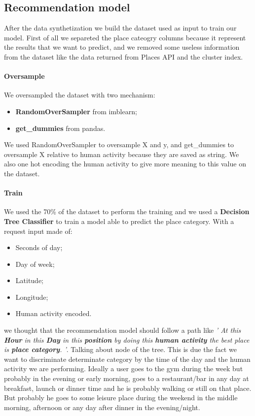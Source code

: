 \documentclass[../../main]{subfiles}
\begin{document}
\label{ss:recommendation-model}
\subsection{Recommendation model}
After the data synthetization we build the dataset used as input to train our model. First of all we separeted the place cateogry columns because it represent the results that we want to predict, and we removed some useless information from the dataset like the data returned from Places API and the cluster index.
\paragraph*{Oversample}
We oversampled the dataset with two mechanism:
\begin{itemize}
    \item \textbf{RandomOverSampler} from imblearn;
    \item \textbf{get\_dummies} from pandas.
\end{itemize}

We used RandomOverSampler to oversample X and y, and get\_dummies to oversample X relative to human activity
because they are saved as string. We also one hot encoding the human activity to give more meaning to this value on the dataset.

\paragraph*{Train}
We used the 70\% of the dataset to perform the training and we used a \textbf{Decision Tree Classifier} to train a model able to
predict the place category. 
With a request input made of:
\begin{itemize}
    \item Seconds of day;
    \item Day of week;
    \item Latitude;
    \item Longitude;
    \item Human activity encoded.
\end{itemize}
we thought that the recommendation model should follow a path like \textit{' At this \textbf{Hour} in this \textbf{Day} in this \textbf{position} by doing this \textbf{human activity} the best place is \textbf{place category}. '}.
Talking about node of the tree. This is due the fact we want to discriminate determinate category by the time of the day and the human activity we are performing.
Ideally a user goes to the gym during the week but probably in the evening or early morning, 
goes to a restaurant/bar in any day at breakfast, launch or dinner time and he is probably walking or still on that place.
But probably he goes to some leisure place during the weekend in the middle morning, afternoon or any day after dinner in the evening/night.
\end{document}
